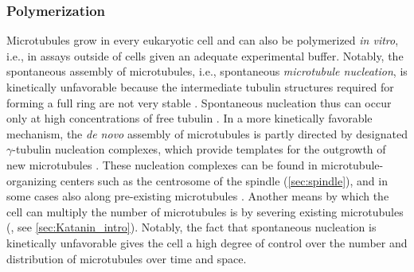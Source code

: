 \subsubsection{Polymerization}
\label{sec:instability}
Microtubules grow in every eukaryotic cell and can also be polymerized \textit{in vitro}, i.e., in assays outside of cells given an adequate experimental buffer. Notably, the spontaneous assembly of microtubules, i.e., spontaneous \textit{microtubule nucleation}, is kinetically unfavorable because the intermediate tubulin structures required for forming a full ring are not very stable \parencite{Akhmanova2022}. Spontaneous nucleation thus can occur only at high concentrations of free tubulin \parencite{Fygenson1994}. In a more kinetically favorable mechanism, the \textit{de novo} assembly of microtubules is partly directed by designated $\gamma$-tubulin nucleation complexes, which provide templates for the outgrowth of new microtubules \parencite{Akhmanova2022}. These nucleation complexes can be found in microtubule-organizing centers such as the centrosome of the spindle (\autoref{sec:spindle}), and in some cases also along pre-existing microtubules \parencite{Akhmanova2022, Janson2007}. Another means by which the cell can multiply the number of microtubules is by severing existing microtubules (\cite{Vemu2018}, see \autoref{sec:Katanin_intro}). Notably, the fact that spontaneous nucleation is kinetically unfavorable gives the cell a high degree of control over the number and distribution of microtubules over time and space. \par

